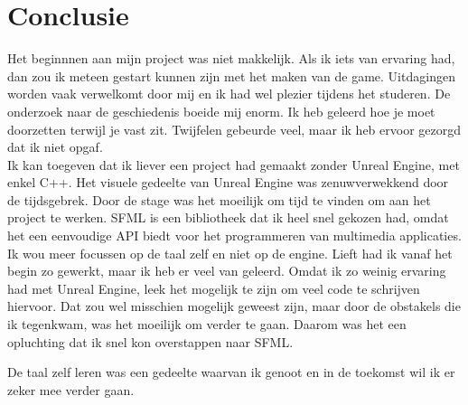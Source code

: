 
\chapter{Conclusie}%
\label{ch:conclusie}


Het beginnnen aan mijn project was niet makkelijk. 
Als ik iets van ervaring had, dan zou ik meteen gestart kunnen zijn met het maken van de game.
Uitdagingen worden vaak verwelkomt door mij en ik had wel plezier tijdens het studeren.
De onderzoek naar de geschiedenis boeide mij enorm. 
Ik heb geleerd hoe je moet doorzetten terwijl je vast zit.
Twijfelen gebeurde veel, maar ik heb ervoor gezorgd dat ik niet opgaf.
\\

Ik kan toegeven dat ik liever een project had gemaakt zonder Unreal Engine, met enkel C++.
Het visuele gedeelte van Unreal Engine was zenuwverwekkend door de tijdsgebrek.
Door de stage was het moeilijk om tijd te vinden om aan het project te werken.
SFML is een bibliotheek dat ik heel snel gekozen had, omdat het een eenvoudige API biedt voor het programmeren van multimedia applicaties.
Ik wou meer focussen op de taal zelf en niet op de engine. Lieft had ik vanaf het begin zo gewerkt, maar ik heb er veel van geleerd.
Omdat ik zo weinig ervaring had met Unreal Engine, leek het mogelijk te zijn om veel code te schrijven hiervoor.
Dat zou wel misschien mogelijk geweest zijn, maar door de obstakels die ik tegenkwam, was het moeilijk om verder te gaan.
Daarom was het een opluchting dat ik snel kon overstappen naar SFML.

De taal zelf leren was een gedeelte waarvan ik genoot en in de toekomst wil ik er zeker mee verder gaan.




